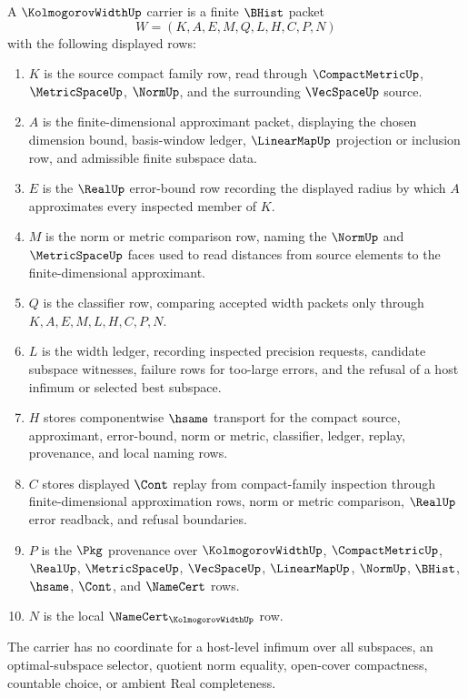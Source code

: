 \begin{definition}
\label{def:kolmogorov-width-carrier}
A $\KolmogorovWidthUp$ carrier is a finite $\BHist$ packet
$$
W=(K,A,E,M,Q,L,H,C,P,N)
$$
with the following displayed rows:
\begin{enumerate}
\item $K$ is the source compact family row, read through $\CompactMetricUp$, $\MetricSpaceUp$, $\NormUp$, and the surrounding $\VecSpaceUp$ source.
\item $A$ is the finite-dimensional approximant packet, displaying the chosen dimension bound, basis-window ledger, $\LinearMapUp$ projection or inclusion row, and admissible finite subspace data.
\item $E$ is the $\RealUp$ error-bound row recording the displayed radius by which $A$ approximates every inspected member of $K$.
\item $M$ is the norm or metric comparison row, naming the $\NormUp$ and $\MetricSpaceUp$ faces used to read distances from source elements to the finite-dimensional approximant.
\item $Q$ is the classifier row, comparing accepted width packets only through $K,A,E,M,L,H,C,P,N$.
\item $L$ is the width ledger, recording inspected precision requests, candidate subspace witnesses, failure rows for too-large errors, and the refusal of a host infimum or selected best subspace.
\item $H$ stores componentwise $\hsame$ transport for the compact source, approximant, error-bound, norm or metric, classifier, ledger, replay, provenance, and local naming rows.
\item $C$ stores displayed $\Cont$ replay from compact-family inspection through finite-dimensional approximation rows, norm or metric comparison, $\RealUp$ error readback, and refusal boundaries.
\item $P$ is the $\Pkg$ provenance over $\KolmogorovWidthUp$, $\CompactMetricUp$, $\RealUp$, $\MetricSpaceUp$, $\VecSpaceUp$, $\LinearMapUp$, $\NormUp$, $\BHist$, $\hsame$, $\Cont$, and $\NameCert$ rows.
\item $N$ is the local $\NameCert_{\KolmogorovWidthUp}$ row.
\end{enumerate}
The carrier has no coordinate for a host-level infimum over all subspaces, an optimal-subspace selector, quotient norm equality, open-cover compactness, countable choice, or ambient Real completeness.
\end{definition}

